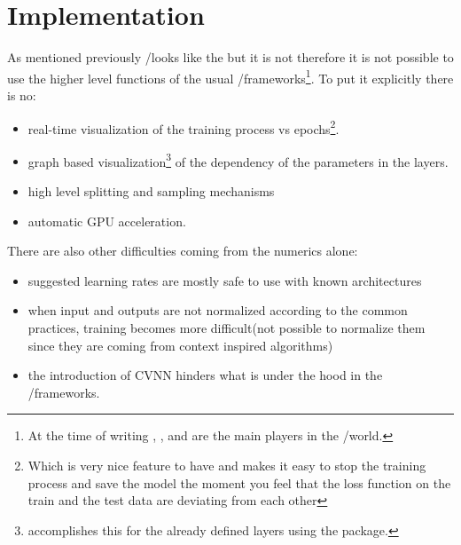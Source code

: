 	
	
	
	
	
	
	
	




\section{Implementation}

As mentioned previously \du/\au looks like the \rnns but it is not therefore it is not possible to use the higher level functions of the usual 
\ml/\dl frameworks\footnote{At the time of writing \tensorflow\cite{Abadi2016}, \keras\cite{Chollet2023}, and \pytorch\cite{Paszke2019} are the 
main players in the \ml/\dl world.}. To put it explicitly there is no:
\begin{itemize}
	\item real-time visualization of the training process vs epochs\footnote{Which is very nice feature to have and makes it easy to stop the training process 
  and save the 
  model the moment you feel that the loss function on the train and the test data are deviating from each other}.
	\item graph based visualization\footnote{\tensorflow accomplishes this for the already defined layers using the \graphviz package.} of the dependency of the parameters in the layers.
	\item high level splitting and sampling mechanisms
	\item automatic \ac{GPU} acceleration. 
\end{itemize}

There are also other difficulties coming from the numerics alone:
\begin{itemize}
	\item suggested learning rates are mostly safe to use with known architectures
	\item when input and outputs are not normalized according to the common practices, training becomes more difficult(not possible to normalize them since they are coming from context inspired algorithms)
	\item the introduction of \ac{CVNN}\cite{CTOBYZDSSSJFSSMNRYBCP2017}\cite{Bassey2021}\cite{Barrachina2023} hinders what is under the hood in the \ml/\dl frameworks.
\end{itemize}

